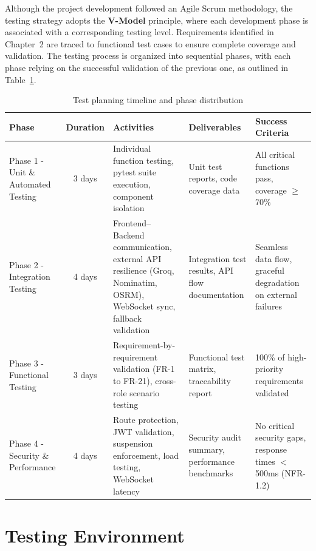Although the project development followed an Agile Scrum methodology, the testing strategy adopts the \textbf{V-Model} principle, where each development phase is associated with a corresponding testing level. Requirements identified in Chapter~2 are traced to functional test cases to ensure complete coverage and validation. The testing process is organized into sequential phases, with each phase relying on the successful validation of the previous one, as outlined in Table~\ref{tab:test_planning}.
\begin{table}[H]
\caption{Test planning timeline and phase distribution}
\centering
\small
\begin{tabularx}{\linewidth}{|l|c|X|X|X|}
\hline
\textbf{Phase} & \textbf{Duration} & \textbf{Activities} & \textbf{Deliverables} & \textbf{Success Criteria} \\
\hline
Phase 1 -Unit \& Automated Testing & 3 days &
Individual function testing, pytest suite execution, component isolation & Unit test reports, code coverage data & All critical functions pass, coverage $\geq$ 70\% \\
\hline
Phase 2 -Integration Testing & 4 days &
Frontend--Backend communication, external API resilience (Groq, Nominatim, OSRM), WebSocket sync, fallback validation & Integration test results, API flow documentation & Seamless data flow, graceful degradation on external failures \\
\hline
Phase 3 -Functional Testing & 3 days &
Requirement-by-requirement validation (FR-1 to FR-21), cross-role scenario testing & Functional test matrix, traceability report & 100\% of high-priority requirements validated \\
\hline
Phase 4 -Security \& Performance & 4 days &
Route protection, JWT validation, suspension enforcement, load testing, WebSocket latency & Security audit summary, performance benchmarks & No critical security gaps, response times $<$ 500ms (NFR-1.2) \\
\hline
\end{tabularx}

\label{tab:test_planning}
\end{table}



\section{Testing Environment}


